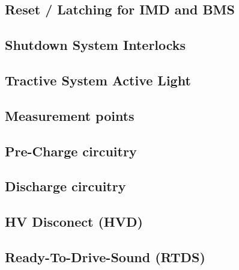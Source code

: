 \documentclass{article}[12pt]
\begin{document}
\subsection{Reset / Latching for IMD and BMS} \label{subsec:Reset}


\subsection{Shutdown System Interlocks}\label{subsec:SDCInterlocks}


\subsection{Tractive System Active Light}\label{subsec:TSAL}


\subsection{Measurement points}\label{subsec:MeasurementPoints}


\subsection{Pre-Charge circuitry}\label{subsec:PrechargeCircuitry}


\subsection{Discharge circuitry}\label{subsec:DischargeCircuitry}


\subsection{HV Disconect (HVD)}\label{subsec:HVD}


\subsection{Ready-To-Drive-Sound (RTDS)}\label{subsec:RTDS}

\end{document}
